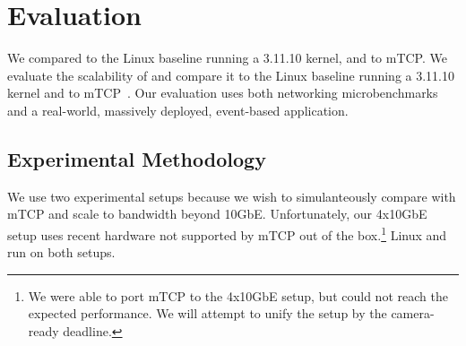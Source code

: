 
\section{Evaluation}
\label{sec:eval}

We compared \ix to the Linux baseline running a 3.11.10 kernel, and to
mTCP\@. We evaluate the scalability of \ix and compare it to the Linux
baseline running a 3.11.10 kernel and to mTCP~\cite{jeong2014mtcp}. 
Our evaluation uses both networking microbenchmarks and a real-world,
massively deployed, event-based application. 



\subsection{Experimental Methodology}
\label{sec:eval:setup}

We use two experimental setups because we wish to simulanteously
compare with mTCP and scale to bandwidth beyond 10GbE.  Unfortunately,
our 4x10GbE setup uses recent hardware not supported by mTCP out of the
box.\footnote{We were able to port mTCP to the 4x10GbE setup, but
  could not reach the expected performance.  We will attempt to unify
  the setup by the camera-ready deadline.}  Linux and \ix run on both
setups.



